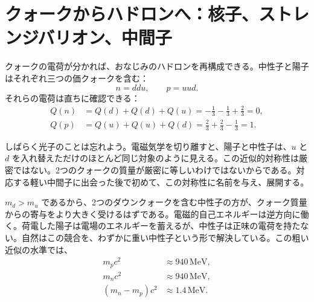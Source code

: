 \begin{classroomqa}
\end{classroomqa}

\section{クォークからハドロンへ：核子、ストレンジバリオン、中間子}

クォークの電荷が分かれば、おなじみのハドロンを再構成できる。中性子と陽子はそれぞれ三つの価クォークを含む：
\begin{equation}
n=ddu,
\qquad
p=uud.
\end{equation}
それらの電荷は直ちに確認できる：
\begin{align}
Q(n) &= Q(d)+Q(d)+Q(u)
= -\frac13-\frac13+\frac23
=0,\\
Q(p) &= Q(u)+Q(u)+Q(d)
= \frac23+\frac23-\frac13
=1.
\end{align}

しばらく光子のことは忘れよう。電磁気学を切り離すと、陽子と中性子は、\(u\) と \(d\) を入れ替えただけのほとんど同じ対象のように見える。この近似的対称性は厳密ではない。2つのクォークの質量が厳密に等しいわけではないからである。対応する軽い中間子に出会った後で初めて、この対称性に名前を与え、展開する。

\(m_d>m_u\) であるから、2つのダウンクォークを含む中性子の方が、クォーク質量からの寄与をより大きく受けるはずである。電磁的自己エネルギーは逆方向に働く。荷電した陽子は電場のエネルギーを蓄えるが、中性子は正味の電荷を持たない。自然はこの競合を、わずかに重い中性子という形で解決している。この粗い近似の水準では、
\begin{align}
m_pc^2&\approx940\,\mathrm{MeV},\\
m_nc^2&\approx940\,\mathrm{MeV},\\
(m_n-m_p)c^2&\approx1.4\,\mathrm{MeV}.
\end{align}

\begin{classroomqa}
\end{classroomqa}

